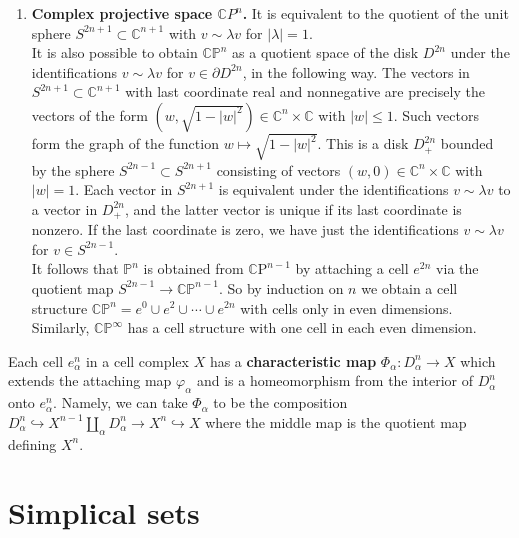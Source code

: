 \begin{example}
\begin{enumerate}
        \item \textbf{Complex projective space $\mathbb{C} P^n$.} It is equivalent to the quotient of the unit sphere $S^{2 n+1} \subset \mathbb{C}^{n+1}$ with $v \sim \lambda v$ for $|\lambda|=1$. \\
        It is also possible to obtain $\mathbb{C P}^n$ as a quotient space of the disk $D^{2 n}$ under the identifications $v \sim \lambda v$ for $v \in \partial D^{2 n}$, in the following way. The vectors in $S^{2 n+1} \subset \mathbb{C}^{n+1}$ with last coordinate real and nonnegative are precisely the vectors of the form $\left(w, \sqrt{1-|w|^2}\right) \in \mathbb{C}^n \times \mathbb{C}$ with $|w| \leq 1$. Such vectors form the graph of the function $w \mapsto \sqrt{1-|w|^2}$. This is a disk $D_{+}^{2 n}$ bounded by the sphere $S^{2 n-1} \subset S^{2 n+1}$ consisting of vectors $(w, 0) \in \mathbb{C}^n \times \mathbb{C}$ with $|w|=1$. Each vector in $S^{2 n+1}$ is equivalent under the identifications $v \sim \lambda v$ to a vector in $D_{+}^{2 n}$, and the latter vector is unique if its last coordinate is nonzero. If the last coordinate is zero, we have just the identifications $v \sim \lambda v$ for $v \in S^{2 n-1}$.\\
        It follows that $\mathbb{P}^n$ is obtained from $\mathbb{C} \mathrm{P}^{n-1}$ by attaching a cell $e^{2 n}$ via the quotient map $S^{2 n-1} \rightarrow \mathbb{C P}^{n-1}$. So by induction on $n$ we obtain a cell structure $\mathbb{C P}^n=e^0 \cup e^2 \cup \cdots \cup e^{2 n}$ with cells only in even dimensions. Similarly, $\mathbb{C P}^{\infty}$ has a cell structure with one cell in each even dimension.
    \end{enumerate}
\end{example}

Each cell $e_\alpha^n$ in a cell complex $X$ has a \textbf{characteristic map} $\Phi_\alpha: D_\alpha^n \rightarrow X$ which extends the attaching map $\varphi_\alpha$ and is a homeomorphism from the interior of $D_\alpha^n$ onto $e_\alpha^n$. Namely, we can take $\Phi_\alpha$ to be the composition $D_\alpha^n \hookrightarrow X^{n-1} \coprod_\alpha D_\alpha^n \rightarrow X^n \hookrightarrow X$ where the middle map is the quotient map defining $X^n$. 





\section{Simplical sets}

